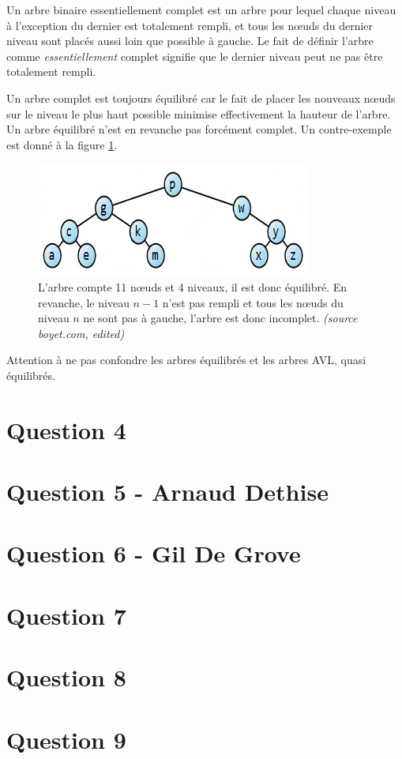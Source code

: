\documentclass[10pt,a4paper]{article}
\begin{document}
	Un arbre binaire essentiellement complet est un arbre pour lequel chaque niveau à l'exception du dernier est totalement rempli, et tous les nœuds du dernier niveau sont placés aussi loin que possible à gauche.
	Le fait de définir l'arbre comme \textit{essentiellement} complet signifie que le dernier niveau peut ne pas être totalement rempli.
	
	Un arbre complet est toujours équilibré car le fait de placer les nouveaux nœuds sur le niveau le plus haut possible minimise effectivement la hauteur de l'arbre.
	Un arbre équilibré n'est en revanche pas forcément complet. Un contre-exemple est donné à la figure \ref{balanced_incomplete_tree}.
	
	\begin{figure}[!h]
	\begin{center}
		\includegraphics[scale=.7]{q3-balanced_incomplete_tree.png}
		\caption{L'arbre compte 11 nœuds et 4 niveaux, il est donc équilibré. En revanche, le niveau $n-1$ n'est pas rempli et tous les nœuds du niveau $n$ ne sont pas à gauche, l'arbre est donc incomplet. \textit{(source boyet.com, edited)}}
		\label{balanced_incomplete_tree}
	\end{center}
	\end{figure}
	
	Attention à ne pas confondre les arbres équilibrés et les arbres AVL, quasi équilibrés.


\section*{Question 4}
\section*{Question 5 - Arnaud Dethise}
\section*{Question 6 - Gil De Grove}
\section*{Question 7}
\section*{Question 8}
\section*{Question 9}
\end{document}
